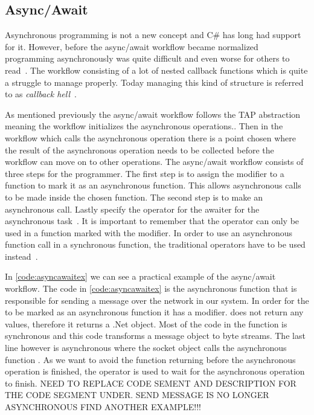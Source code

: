 \subsection{Async/Await}
Asynchronous programming is not a new concept and C\# has long had support for it. However, before the async/await workflow became normalized programming asynchronously was quite difficult and even worse for others to read~\cite{DOC:TaskAsyncProgModel}. The workflow consisting of a lot of nested callback functions which is quite a struggle to manage properly. Today managing this kind of structure is referred to as \emph{callback hell}~\cites[p.~1-2]{PAPER:Callbackhell}[p~.2]{PAPER:PaxosCleipnir}.

As mentioned previously the async/await workflow follows the TAP abstraction~\cite{DOC:TaskAsyncProgModel} meaning the workflow initializes the asynchronous operations.. Then in the workflow which calls the asynchronous operation there is a point chosen where the result of the asynchronous operation needs to be collected before the workflow can move on to other operations. The async/await workflow consists of three steps for the programmer. The first step is to assign the  modifier to a function to mark it as an asynchronous function. This allows asynchronous calls to be made inside the chosen function. The second step is to make an asynchronous call. Lastly specify the  operator for the awaiter for the asynchronous task~\cite{WEB:AsyncAwaitTut, DOC:AsyncAwait, VIDEO:AsyncConBack}.
It is important to remember that the  operator can only be used in a function marked with the  modifier. In order to use an asynchronous function call in a synchronous function, the traditional operators have to be used instead~\cite{DOC:AsyncAwait, DOC:TaskAsyncProgModel}.

In \autoref{code:asyncawaitex} we can see a practical example of the async/await workflow.
The code in \autoref{code:asyncawaitex} is the asynchronous function that is responsible for sending a message over the network in our system. In order for the  to be marked as an asynchronous function it has a  modifier.  does not return any values, therefore it returns a .Net  object. Most of the code in the function is synchronous and this code transforms a message object to byte streams. The last line however is asynchronous where the socket object calls the asynchronous function . As we want to avoid the function returning before the asynchronous operation is finished, the  operator is used to wait for the asynchronous operation to finish.
NEED TO REPLACE CODE SEMENT AND DESCRIPTION FOR THE CODE SEGMENT UNDER. SEND MESSAGE IS NO LONGER ASYNCHRONOUS FIND ANOTHER EXAMPLE!!!

